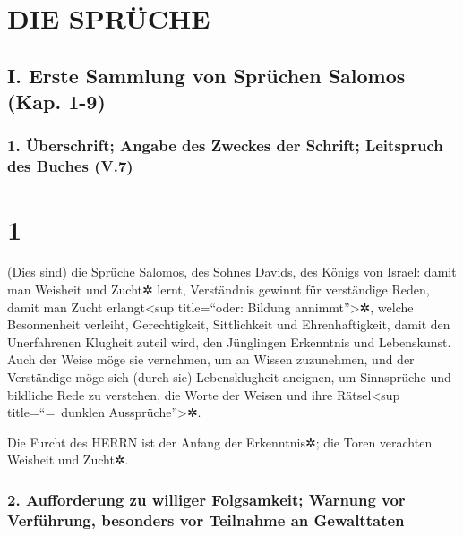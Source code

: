\hypertarget{die-spruxfcche}{%
\section{DIE SPRÜCHE}\label{die-spruxfcche}}

\hypertarget{i.-erste-sammlung-von-spruxfcchen-salomos-kap.-1-9}{%
\subsection{I. Erste Sammlung von Sprüchen Salomos (Kap.
1-9)}\label{i.-erste-sammlung-von-spruxfcchen-salomos-kap.-1-9}}

\hypertarget{uxfcberschrift-angabe-des-zweckes-der-schrift-leitspruch-des-buches-v.7}{%
\subsubsection{1. Überschrift; Angabe des Zweckes der Schrift;
Leitspruch des Buches
(V.7)}\label{uxfcberschrift-angabe-des-zweckes-der-schrift-leitspruch-des-buches-v.7}}

\hypertarget{section}{%
\section{1}\label{section}}

(Dies sind) die Sprüche Salomos, des Sohnes Davids, des
Königs von Israel: damit man Weisheit und Zucht✲ lernt,
Verständnis gewinnt für verständige Reden, damit man Zucht
erlangt\textless sup title=``oder: Bildung annimmt''\textgreater✲,
welche Besonnenheit verleiht, Gerechtigkeit, Sittlichkeit und
Ehrenhaftigkeit, damit den Unerfahrenen Klugheit zuteil
wird, den Jünglingen Erkenntnis und Lebenskunst. Auch der
Weise möge sie vernehmen, um an Wissen zuzunehmen, und der Verständige
möge sich (durch sie) Lebensklugheit aneignen, um
Sinnsprüche und bildliche Rede zu verstehen, die Worte der Weisen und
ihre Rätsel\textless sup title=``=~dunklen Aussprüche''\textgreater✲.

Die Furcht des HERRN ist der Anfang der Erkenntnis✲; die
Toren verachten Weisheit und Zucht✲.

\hypertarget{aufforderung-zu-williger-folgsamkeit-warnung-vor-verfuxfchrung-besonders-vor-teilnahme-an-gewalttaten}{%
\subsubsection{2. Aufforderung zu williger Folgsamkeit; Warnung vor
Verführung, besonders vor Teilnahme an
Gewalttaten}\label{aufforderung-zu-williger-folgsamkeit-warnung-vor-verfuxfchrung-besonders-vor-teilnahme-an-gewalttaten}}

